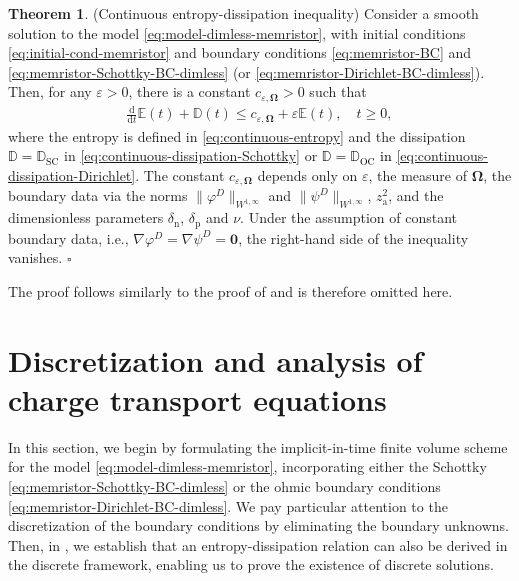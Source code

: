 \documentclass[10pt,a4paper, final]{article}
\newcommand{\reviewerTwo}[1]{\textcolor{black}{#1}}
\def\electrons{\text{n}}
\def\holes{\text{p}}
\def\ions{\text{a}}
\newcommand*{\QEDB}{\null\nobreak\hfill\ensuremath{\square}}%
\theoremstyle{definition}								%
\newtheorem{theorem}{Theorem}
\numberwithin{equation}{section}
\numberwithin{figure}{section}
\numberwithin{theorem}{section}
\begin{document}
\begin{theorem}(Continuous entropy-dissipation inequality) \label{thm:cont-E-D-memristor}
    Consider a smooth solution to the model \eqref{eq:model-dimless-memristor}, with initial conditions \eqref{eq:initial-cond-memristor} and boundary conditions \eqref{eq:memristor-BC} and \eqref{eq:memristor-Schottky-BC-dimless} (or \eqref{eq:memristor-Dirichlet-BC-dimless}).
    Then, for any $\varepsilon>0$, there is a constant $c_{\varepsilon, \mathbf{\Omega}}>0$ such that
    \begin{align} \label{eq:continuous-E-D-inequality-memristor}
        \frac{\text{d}}{\text{d}t}\mathbb{E}(t)  +  \mathbb{D}(t) \leq c_{\varepsilon, \mathbf{\Omega}} + \varepsilon \mathbb{E}(t), \quad t \geq 0,
    \end{align}
    where the entropy is defined in \eqref{eq:continuous-entropy} and the dissipation \reviewerTwo{$\mathbb{D} = \mathbb{D}_{\text{SC}}$} in \eqref{eq:continuous-dissipation-Schottky} or \reviewerTwo{$\mathbb{D} = \mathbb{D}_{\text{OC}}$ in} \eqref{eq:continuous-dissipation-Dirichlet}.
    The constant $c_{\varepsilon, \mathbf{\Omega}}$ depends only on $\varepsilon$, the measure of $\mathbf{\Omega}$, the boundary data via the norms $\|\varphi^D\|_{W^{1,\infty}}$ and $\|\psi^D\|_{W^{1,\infty}}$, $z_{\ions}^2$, and the dimensionless parameters $\delta_\electrons$, $\delta_\holes$ and $\nu$.
    Under the assumption of constant boundary data,  i.e., $\nabla\varphi^D = \nabla\psi^D = \mathbf{0} $, the right-hand side of the inequality vanishes. \QEDB
\end{theorem}
The proof follows similarly to the proof of \cite[Theorem 3.3]{Abdel2023Existence} and is therefore omitted here.

\section{Discretization and analysis of charge transport equations}
\label{sec:discrete_model}

In this section, we begin by formulating the implicit-in-time finite volume scheme for the model \eqref{eq:model-dimless-memristor}, incorporating either the Schottky \eqref{eq:memristor-Schottky-BC-dimless} or the ohmic boundary conditions \eqref{eq:memristor-Dirichlet-BC-dimless}.
We pay particular attention to the discretization of the boundary conditions by eliminating the boundary unknowns.
Then, in , we establish that an entropy-dissipation relation can also be derived in the discrete framework, enabling us to prove the existence of discrete solutions.
\end{document}
